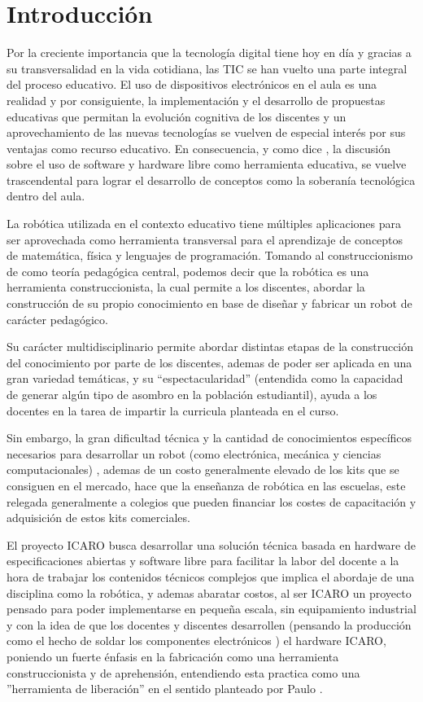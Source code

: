 \section{Introducción}

Por la creciente importancia que la tecnología digital tiene hoy en día y gracias a su transversalidad en la vida cotidiana, las TIC se han vuelto una parte integral del proceso educativo. El uso de dispositivos electrónicos en el aula es una realidad y por consiguiente, la implementación y el desarrollo de propuestas educativas que permitan la evolución cognitiva de los discentes y un aprovechamiento de las nuevas tecnologías se vuelven de especial interés por sus ventajas como recurso educativo. En consecuencia, y como dice \citet{chavarria_software_2011}, la discusión sobre el uso de software y hardware libre como herramienta educativa, se vuelve trascendental para lograr el desarrollo de conceptos como la soberanía tecnológica dentro del aula.

La robótica utilizada en el  contexto educativo tiene múltiples  aplicaciones para ser aprovechada como herramienta transversal para el aprendizaje de conceptos de matemática, física y lenguajes de programación. Tomando al construccionismo de \citet{papert_childrens_1993} como teoría pedagógica central, podemos decir que la robótica es una herramienta construccionista, la cual permite a los discentes, abordar  la construcción de su propio conocimiento en base de diseñar y fabricar un robot de carácter pedagógico.  

Su carácter multidisciplinario permite abordar distintas etapas de la construcción del conocimiento por parte de los discentes, ademas de poder ser aplicada en una gran variedad temáticas, y su “espectacularidad” (entendida como la capacidad de generar algún tipo de asombro en la población estudiantil), ayuda a los docentes en la tarea de impartir la curricula planteada en el curso.

Sin embargo, la gran dificultad técnica y la cantidad de conocimientos específicos necesarios para desarrollar un robot (como electrónica, mecánica y ciencias computacionales) , ademas de un costo generalmente elevado de los kits que se consiguen en el mercado, hace que la enseñanza de robótica en las escuelas, este relegada generalmente a colegios que pueden financiar los costes de capacitación y adquisición de estos kits comerciales.

El proyecto ICARO busca desarrollar una solución técnica basada en hardware de especificaciones abiertas y software libre para facilitar la labor del docente a la hora de trabajar los contenidos técnicos complejos que implica el abordaje de una disciplina como la robótica, y ademas abaratar costos, al ser ICARO un proyecto pensado para poder implementarse en pequeña escala, sin equipamiento industrial y con la idea de que los docentes y discentes desarrollen (pensando la producción como el hecho de soldar los componentes electrónicos ) el hardware ICARO, poniendo un fuerte énfasis en la fabricación como una herramienta construccionista y de aprehensión, entendiendo esta practica como una ''herramienta de liberación'' en el sentido planteado por Paulo \citet{freire_pedagogioprimido._2015}.

